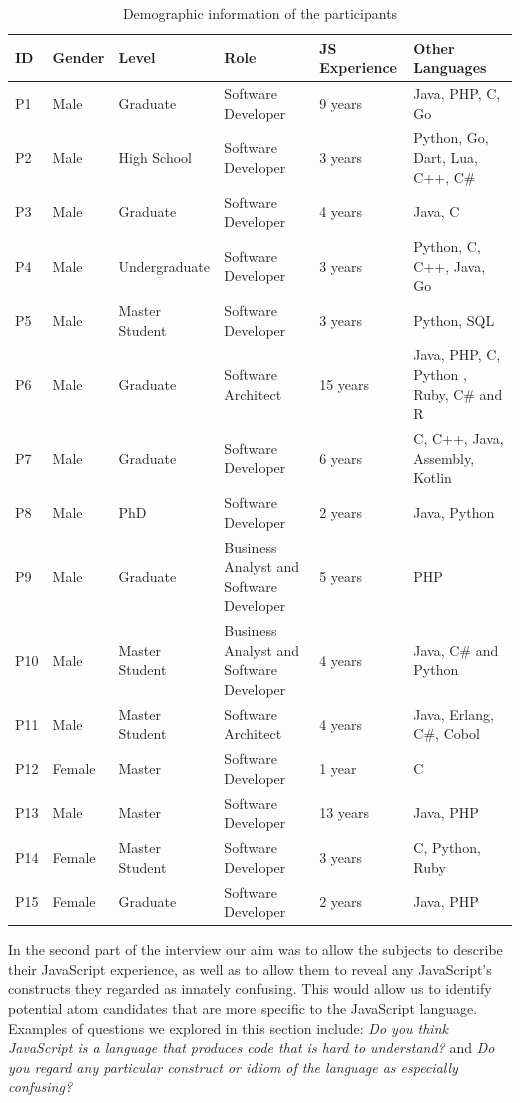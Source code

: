 \begin{table}[htb!]
\centering
\begin{tabular}
{p{0.4cm}p{0.9cm}p{2.0cm}p{6cm}p{1.9cm} p{4.5cm}}
\toprule
ID & Gender & Level & Role & JS Experience & Other Languages \\ \midrule 
P1 & Male & Graduate & Software Developer & 9 years & Java, PHP, C, Go  
\\ 
P2 & Male & High School & Software Developer & 3 years & Python, Go, Dart, Lua, C++, C\#
\\ 
P3 & Male & Graduate & Software Developer & 4 years & Java, C
\\ 
P4 & Male & Undergraduate & Software Developer & 3 years & Python, C, C++, Java, Go
\\ 
P5 & Male & Master Student & Software Developer & 3 years & Python, SQL
\\ 
P6 & Male & Graduate & Software Architect  & 15  years  & Java, PHP, C, Python , Ruby, C\# and R
\\ 
P7 & Male & Graduate & Software Developer  & 6 years & C, C++, Java, Assembly, Kotlin
\\ 
P8 & Male & PhD & Software Developer & 2 years & Java, Python
\\ 
P9 & Male & Graduate & Business Analyst and Software Developer & 5 years & PHP
\\ 
P10 & Male & Master Student & Business Analyst and Software Developer  & 4 years & Java, C\# and Python
\\ 
P11 & Male & Master Student & Software Architect & 4 years & Java, Erlang, C\#, Cobol
\\ 
P12 & Female & Master & Software Developer  & 1 year & C
\\ 
P13 & Male & Master & Software Developer & 13 years & Java, PHP
\\ 
P14 & Female & Master Student & Software Developer  & 3 years & C, Python, Ruby
\\ 
P15 & Female &  Graduate & Software Developer & 2 years & Java, PHP
\\ \bottomrule
\end{tabular}
    \caption{Demographic information of the participants}
    \label{pinterview}
\end{table}

In the second part of the interview our aim was to allow the subjects to describe
their JavaScript experience, as well as to allow them to reveal any JavaScript's constructs they regarded as innately confusing. This would allow us to identify potential atom candidates that are more specific to the JavaScript language. Examples of questions we explored in this section include: \emph{Do you think JavaScript is a language that produces code that is hard to understand?} and \emph{Do you regard any particular construct or idiom of the language as
  especially confusing?}


